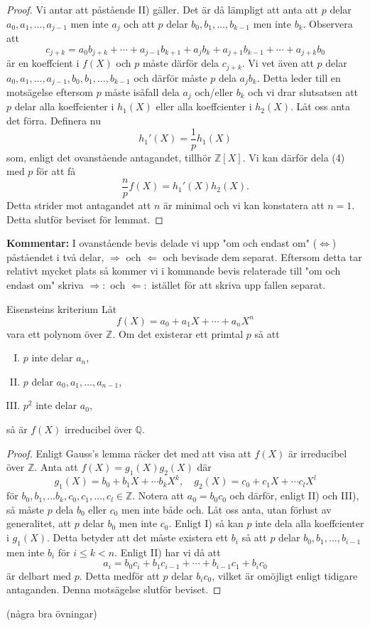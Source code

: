 \documentclass{article}
\theoremstyle{definition}
\begin{document}
\begin{proof}
  Vi antar att påstående II) gäller. Det är då lämpligt att anta att $p$ delar $a_0, a_{1}, \ldots, a_{j-1}$ men inte $a_j$ och att 
  $p$ delar $b_0, b_{1}, \ldots, b_{k-1}$ men inte $b_k$. Observera att
  \[c_{j+k} = a_0b_{j+k} + \cdots + a_{j-1}b_{k+1} + a_jb_k + a_{j+1}b_{k-1} + \cdots + a_{j+k}b_0\]
  är en koeffcient i $f(X)$ och $p$ måste därför dela $c_{j+k}$. Vi vet även att $p$ delar $a_0, a_{1}, \ldots, a_{j-1}, b_0, b_{1}, \ldots, b_{k-1}$ 
  och därför måste $p$ dela $a_j b_k$. Detta leder till en motsägelse eftersom $p$ måste isåfall dela $a_j$ och/eller $b_k$ och vi drar slutsatsen att 
  $p$ delar alla koeffcienter i $h_1(X)$ eller alla koeffcienter i $h_2(X)$. Låt oss anta det förra. Definera nu 
  \[h_1'(X) = \frac{1}{p} h_1(X)\]
  som, enligt det ovanstående antagandet, tillhör $\mathbb{Z}[X].$ Vi kan därför dela (4) med $p$ för att få
  \[\frac{n}{p} f(X) = h_1'(X) h_2(X).\]
  Detta strider mot antagandet att $n$ är minimal och vi kan konstatera att $n=1$. Detta slutför beviset för lemmat.
\end{proof}
\textbf{Kommentar: }I ovanstående bevis delade vi upp "om och endast om" ($\iff$) påståendet i två delar, 
$\Rightarrow$ och $\Leftarrow$ och bevisade dem separat. Eftersom detta tar relativt mycket plats så kommer vi i kommande bevis relaterade till "om och endast om"
skriva $\Rightarrow:$ och $\Leftarrow:$ istället för att skriva upp fallen separat. 
\begin{mytheo}{Eisensteins kriterium}{}
  Låt
  \[f(X) = a_0 + a_1X + \cdots + a_nX^n\]
  vara ett polynom över $\mathbb{Z}$. Om det existerar ett primtal $p$ så att 
  \begin{enumerate}[I)]
    \item $p$ inte delar $a_n$,
    \item $p$ delar $a_0, a_1, \ldots, a_{n-1}$,
    \item $p^2$ inte delar $a_0$,
  \end{enumerate}
  så är $f(X)$ irreducibel över $\mathbb{Q}$.
\end{mytheo}
\begin{proof}
  Enligt Gauss's lemma räcker det med att visa att $f(X)$ är irreducibel över $\mathbb{Z}$. Anta att $f(X) = g_1(X) g_2(X)$ där 
  \[g_1(X) = b_0 + b_1X + \cdots b_kX^k, \quad g_2(X) = c_0 + c_1X + \cdots c_lX^l\]
  för $b_0, b_1, \ldots b_k, c_0, c_1, \ldots, c_l \in \mathbb{Z}.$
  Notera att $a_0 = b_0 c_0$ och därför, enligt II) och III), så måste $p$ dela $b_0$ eller $c_0$ men inte både och. Låt oss anta, utan förlust av 
  generalitet, att $p$ delar $b_0$ men inte $c_0$. Enligt I) så kan $p$ inte dela alla koeffcienter i $g_1(X)$. Detta betyder att det måste existera ett $b_i$ så att $p$ delar
  $b_0, b_1, \ldots, b_{i-1}$ men inte $b_i$ för $i \leq k < n$. Enligt II) har vi då att 
  \[a_i = b_0c_i + b_1c_{i-1} + \cdots + b_{i-1}c_1 + b_ic_0\]
  är delbart med $p$. Detta medför att $p$ delar $b_i c_0$, vilket är omöjligt enligt tidigare antaganden.
  Denna motsägelse slutför beviset.
\end{proof}
(några bra övningar)
\end{document}
